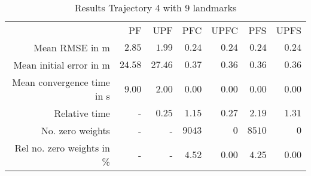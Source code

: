 \begin{table}
\centering
\begin{tabular}{rrrrrrr}
 & PF & UPF & PFC & UPFC & PFS & UPFS \\
Mean RMSE in m & $2.85$ & $1.99$ & $0.24$ & $0.24$ & $0.24$ & $0.24$ \\
Mean initial error in m & $24.58$ & $27.46$ & $0.37$ & $0.36$ & $0.36$ & $0.36$ \\
Mean convergence time in s & $9.00$ & $2.00$ & $0.00$ & $0.00$ & $0.00$ & $0.00$ \\
Relative time & - & $0.25$ & $1.15$ & $0.27$ & $2.19$ & $1.31$ \\
No. zero weights & - & - & $9043$ & $0$ & $8510$ & $0$ \\
Rel no. zero weights in \% & - & - & $4.52$ & $0.00$ & $4.25$ & $0.00$ \\
\end{tabular}
\caption{Results Trajectory 4 with 9 landmarks}
\label{table:landmark_positions_4}
\end{table}
